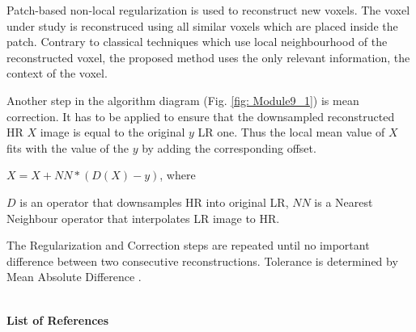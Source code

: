 Patch-based non-local regularization is used to reconstruct new voxels. The voxel under study is reconstruced using all similar voxels which are placed inside the patch. Contrary to classical techniques which use local neighbourhood of the reconstructed voxel, the proposed method uses the only relevant information, the context of the voxel.

Another step in the algorithm diagram (Fig. \ref{fig: Module9_1}) is mean correction. It has to be applied to ensure that the downsampled reconstructed HR $X$ image is equal to the original $y$ LR one. Thus the local mean value of $X$ fits with the value of the $y$ by adding the corresponding offset.

\centerline{$X=X+NN*(D(X)-y)$, where}


$D$ is an operator that downsamples HR into original LR,
\newline $NN$ is a Nearest Neighbour operator that interpolates LR image to HR.

The Regularization and Correction steps are repeated until no important difference between two consecutive reconstructions. Tolerance is determined by Mean Absolute Difference .

\hfill{}\\
\textbf{List of References}\\
\cite{9art1}
\cite{9art2}